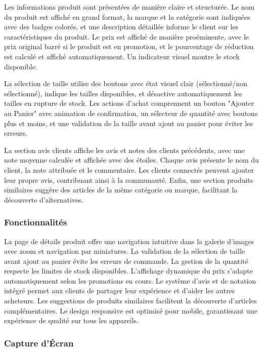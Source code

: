\documentclass[12pt,a4paper]{article}
\begin{document}
Les informations produit sont présentées de manière claire et structurée. Le nom du produit est affiché en grand format, la marque et la catégorie sont indiquées avec des badges colorés, et une description détaillée informe le client sur les caractéristiques du produit. Le prix est affiché de manière proéminente, avec le prix original barré si le produit est en promotion, et le pourcentage de réduction est calculé et affiché automatiquement. Un indicateur visuel montre le stock disponible.

La sélection de taille utilise des boutons avec état visuel clair (sélectionné/non sélectionné), indique les tailles disponibles, et désactive automatiquement les tailles en rupture de stock. Les actions d'achat comprennent un bouton "Ajouter au Panier" avec animation de confirmation, un sélecteur de quantité avec boutons plus et moins, et une validation de la taille avant ajout au panier pour éviter les erreurs.

La section avis clients affiche les avis et notes des clients précédents, avec une note moyenne calculée et affichée avec des étoiles. Chaque avis présente le nom du client, la note attribuée et le commentaire. Les clients connectés peuvent ajouter leur propre avis, contribuant ainsi à la communauté. Enfin, une section produits similaires suggère des articles de la même catégorie ou marque, facilitant la découverte d'alternatives.

\subsubsection{Fonctionnalités}

La page de détails produit offre une navigation intuitive dans la galerie d'images avec zoom et navigation par miniatures. La validation de la sélection de taille avant ajout au panier évite les erreurs de commande. La gestion de la quantité respecte les limites de stock disponibles. L'affichage dynamique du prix s'adapte automatiquement selon les promotions en cours. Le système d'avis et de notation intégré permet aux clients de partager leur expérience et d'aider les autres acheteurs. Les suggestions de produits similaires facilitent la découverte d'articles complémentaires. Le design responsive est optimisé pour mobile, garantissant une expérience de qualité sur tous les appareils.

\subsubsection{Capture d'Écran}
\end{document}
